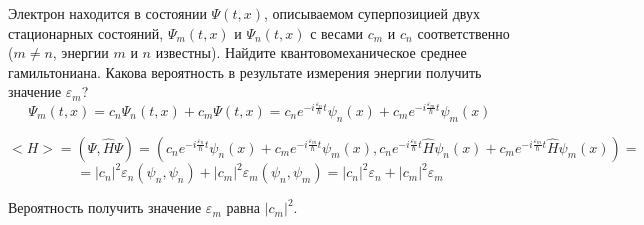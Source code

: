 \documentclass[__main__.tex]{subfiles}
\begin{document}
Электрон находится в состоянии $\Psi(t,x)$, описываемом суперпозицией двух стационарных состояний, $\Psi_m(t,x)$ и $\Psi_n(t,x)$ с весами $c_m$ и $c_n$ соответственно ($m\neq n$, энергии $m$ и $n$ известны). Найдите квантовомеханическое среднее гамильтониана. Какова вероятность в результате измерения энергии получить значение $\varepsilon_m$?\\ 

$$\Psi_m(t, x) = c_n \Psi_n(t, x) + c_m \Psi(t, x) = c_n e^{-i\frac{\varepsilon_n}{\hbar} t} \psi_n(x) + c_m e^{-i \frac{\varepsilon_m}{\hbar} t} \psi_m(x)$$

$$<H> = (\Psi, \hat{H}\Psi) = ( c_n e^{-i\frac{\varepsilon_n}{\hbar} t} \psi_n(x) + c_m e^{-i \frac{\varepsilon_m}{\hbar} t} \psi_m(x),  c_n e^{-i\frac{\varepsilon_n}{\hbar} t} \hat{H} \psi_n(x) + c_m e^{-i \frac{\varepsilon_m}{\hbar} t} \hat{H} \psi_m(x)) =$$
$$ = |c_n|^2\varepsilon_n(\psi_n, \psi_n) + |c_m|^2\varepsilon_m(\psi_n, \psi_m) = |c_n|^2\varepsilon_n + |c_m|^2\varepsilon_m$$

Вероятность получить значение $\varepsilon_m$ равна $|c_m|^2$.
\end{document}
